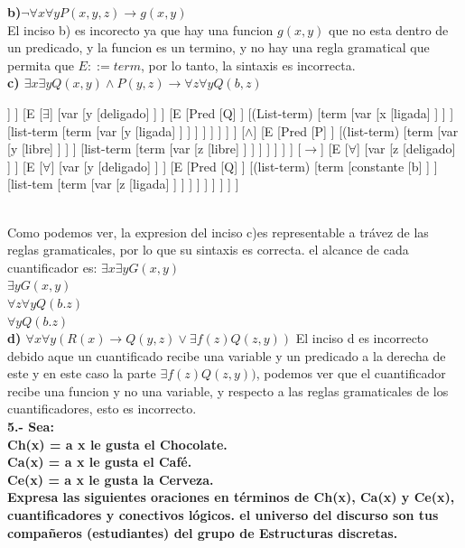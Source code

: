\documentclass[paper=letter, fontsize=12pt]{scrartcl}
\begin{document}
{\bf b)$\neg \forall x\forall yP(x,y,z)\rightarrow g(x,y)$}\\
El inciso b) es incorecto ya que hay una funcion $g(x,y)$ que no esta dentro de un predicado, y la funcion es un termino, y no hay una regla gramatical que permita que $E::= term$, por lo tanto, la sintaxis es incorrecta.\\

{\bf c) $\exists x\exists yQ(x,y) \wedge P(y,z)\rightarrow \forall z\forall yQ(b,z)$}\\
\begin{forest}
[E
	[E
		[E
			[$\exists$]
			[var
				[x
					[deligado]
				]
			]
			[E
				[$\exists$]
				[var
					[y
						[deligado]
					]
				]
				[E
					[Pred
						[Q]
					]
					[(List-term)
						[term
							[var
								[x
									[ligada]
								]
							]
						]
						[list-term
							[term
								[var
									[y
										[ligada]
									]
								]
							]
						]
					]
				]
			]
		]
		[$\wedge$]
		[E
			[Pred
				[P]
			]
			[(list-term)
				[term
					[var
						[y
							[libre]
						]
					]
				]
				[list-term
					[term
						[var
							[z
								[libre]
							]
						]
					]
				]
			]
		]
	]
	[$\rightarrow$]
	[E
		[$\forall$]
		[var
			[z
				[deligado]
			]
		]
		[E
			[$\forall$]
			[var
				[y
					[deligado]
				]
			]
			[E
				[Pred
					[Q]
				]
				[(list-term)
					[term
						[constante
							[b]
						]
					]
					[list-tem
						[term
							[var
								[z
									[ligada]
								]
							]
						]
					]
				]
			]
		]
	]
]
\end{forest}\\
Como podemos ver, la expresion del inciso c)es representable a trávez de las reglas gramaticales, por lo que su sintaxis es correcta.
el alcance de cada cuantificador es:
$\exists x \exists yG(x,y)$\\
$\exists yG(x,y)$\\
$\forall z \forall yQ(b.z)$\\
$\forall yQ(b.z)$\\
{\bf d) $\forall x\forall y(R(x)\rightarrow Q(y,z) \vee \exists f(z)Q(z,y))$}
El inciso d es incorrecto debido aque un cuantificado recibe una variable y un predicado a la derecha de este y en este caso la parte $\exists f(z)Q(z,y))$, podemos ver que el cuantificador recibe una funcion y no una variable, y respecto a las reglas gramaticales de los cuantificadores, esto es incorrecto.\\
\newpage
{\Large{\bf 5.- Sea:\\
Ch(x) = a x le gusta el Chocolate.\\
Ca(x) = a x le gusta el Café.\\
Ce(x) = a x le gusta la Cerveza.\\
Expresa las siguientes oraciones en términos de Ch(x), Ca(x) y Ce(x), cuantificadores y conectivos lógicos. el universo del discurso son tus compañeros (estudiantes) del grupo de Estructuras discretas.}}\\
\end{document}
